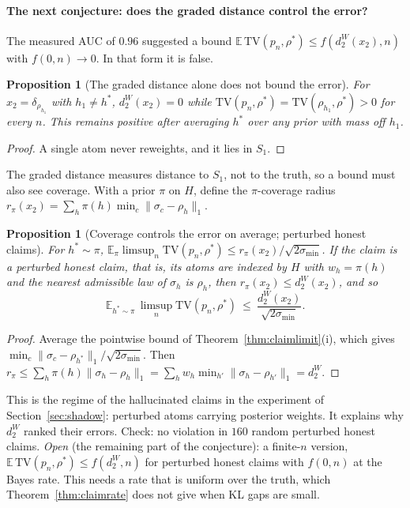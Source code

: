 \documentclass[11pt]{article}
\newtheorem{proposition}[theorem]{Proposition}
\theoremstyle{definition}
\theoremstyle{remark}
\begin{document}
\paragraph{The next conjecture: does the graded distance control the error?} The measured AUC of $0.96$ suggested a bound $\mathbb E\,\mathrm{TV}(p_n,\rho^*)\le f(d_2^W(x_2),n)$ with $f(0,n)\to0$. In that form it is false.
\begin{proposition}[The graded distance alone does not bound the error]\label{prop:noweighted}
For $x_2=\delta_{\rho_{h_1}}$ with $h_1\ne h^*$, $d_2^W(x_2)=0$ while $\mathrm{TV}(p_n,\rho^*)=\mathrm{TV}(\rho_{h_1},\rho^*)>0$ for every $n$. This remains positive after averaging $h^*$ over any prior with mass off $h_1$.
\end{proposition}
\begin{proof}
A single atom never reweights, and it lies in $S_1$.
\end{proof}
The graded distance measures distance to $S_1$, not to the truth, so a bound must also see coverage. With a prior $\pi$ on $H$, define the $\pi$-coverage radius $r_\pi(x_2)=\sum_h\pi(h)\min_c\|\sigma_c-\rho_h\|_1$.
\begin{proposition}[Coverage controls the error on average; perturbed honest claims]\label{prop:coverpi}
For $h^*\sim\pi$, $\mathbb E_\pi\limsup_n\mathrm{TV}(p_n,\rho^*)\le r_\pi(x_2)/\sqrt{2\sigma_{\min}}$. If the claim is a perturbed honest claim, that is, its atoms are indexed by $H$ with $w_h=\pi(h)$ and the nearest admissible law of $\sigma_h$ is $\rho_h$, then $r_\pi(x_2)\le d_2^W(x_2)$, and so
\[\mathbb E_{h^*\sim\pi}\,\limsup_n\mathrm{TV}(p_n,\rho^*)\ \le\ \frac{d_2^W(x_2)}{\sqrt{2\sigma_{\min}}}.\]
\end{proposition}
\begin{proof}
Average the pointwise bound of Theorem~\ref{thm:claimlimit}(i), which gives $\min_c\|\sigma_c-\rho_{h^*}\|_1/\sqrt{2\sigma_{\min}}$. Then $r_\pi\le\sum_h\pi(h)\|\sigma_h-\rho_h\|_1=\sum_hw_h\min_{h'}\|\sigma_h-\rho_{h'}\|_1=d_2^W$.
\end{proof}
This is the regime of the hallucinated claims in the experiment of Section~\ref{sec:shadow}: perturbed atoms carrying posterior weights. It explains why $d_2^W$ ranked their errors. Check: no violation in $160$ random perturbed honest claims. \emph{Open} (the remaining part of the conjecture): a finite-$n$ version, $\mathbb E\,\mathrm{TV}(p_n,\rho^*)\le f(d_2^W,n)$ for perturbed honest claims with $f(0,n)$ at the Bayes rate. This needs a rate that is uniform over the truth, which Theorem~\ref{thm:claimrate} does not give when KL gaps are small.
\end{document}
